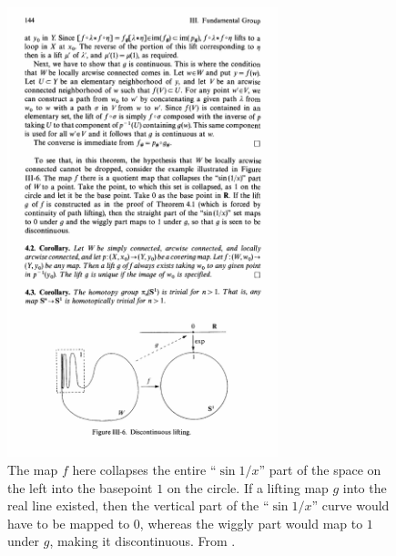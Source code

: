 \begin{figure}[tp]
    \centering
    \includegraphics[width=0.7\textwidth]{figures/discont_lift.pdf}
    \caption{The map $f$ here collapses the entire ``$\sin 1/x$'' part of the space on the left into the basepoint $1$ on the circle. If a lifting map $g$ into the real line existed, then the vertical part of the ``$\sin 1/x$'' curve would have to be mapped to $0$, whereas the wiggly part would map to $1$ under $g$, making it discontinuous. From \cite[Fig.~III-6]{Bredon}.}
    \label{fig:discont_lift}
\end{figure}

